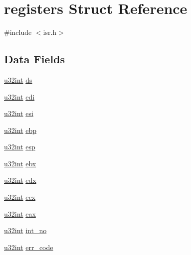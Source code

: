 \hypertarget{structregisters}{
\section{registers Struct Reference}
\label{structregisters}
}


{\ttfamily \#include $<$isr.h$>$}

\subsection*{Data Fields}
\begin{DoxyCompactItemize}
\item 
\hyperlink{library_8h_ad7ecf93b77285d9bf039d27fa3f1a588}{u32int} \hyperlink{structregisters_a27b615cc9d414c57f335c1744908fbd1}{ds}
\item 
\hyperlink{library_8h_ad7ecf93b77285d9bf039d27fa3f1a588}{u32int} \hyperlink{structregisters_ab42cc86f60a286d9cb20116b853239ff}{edi}
\item 
\hyperlink{library_8h_ad7ecf93b77285d9bf039d27fa3f1a588}{u32int} \hyperlink{structregisters_a031d176a324992b1ef7c3b7335383590}{esi}
\item 
\hyperlink{library_8h_ad7ecf93b77285d9bf039d27fa3f1a588}{u32int} \hyperlink{structregisters_a98b65807686fee47d4061d2f2ea8578a}{ebp}
\item 
\hyperlink{library_8h_ad7ecf93b77285d9bf039d27fa3f1a588}{u32int} \hyperlink{structregisters_a7c8cdb0e23278dc958565ee9a5ebb14b}{esp}
\item 
\hyperlink{library_8h_ad7ecf93b77285d9bf039d27fa3f1a588}{u32int} \hyperlink{structregisters_aab632bcfbdfeee937cc42940432af39a}{ebx}
\item 
\hyperlink{library_8h_ad7ecf93b77285d9bf039d27fa3f1a588}{u32int} \hyperlink{structregisters_aeef91c926bff500767180c01b413a537}{edx}
\item 
\hyperlink{library_8h_ad7ecf93b77285d9bf039d27fa3f1a588}{u32int} \hyperlink{structregisters_aab67c5aaaf6afb6a2c47a4c81fb0d567}{ecx}
\item 
\hyperlink{library_8h_ad7ecf93b77285d9bf039d27fa3f1a588}{u32int} \hyperlink{structregisters_aa4608f9844ee6e6e638c487a8c8aa14f}{eax}
\item 
\hyperlink{library_8h_ad7ecf93b77285d9bf039d27fa3f1a588}{u32int} \hyperlink{structregisters_a43eb1111b811b27ece63da7c761004f2}{int\_\-no}
\item 
\hyperlink{library_8h_ad7ecf93b77285d9bf039d27fa3f1a588}{u32int} \hyperlink{structregisters_a4fd8634e5227ec539a055123d1882356}{err\_\-code}

\end{DoxyCompactItemize}
